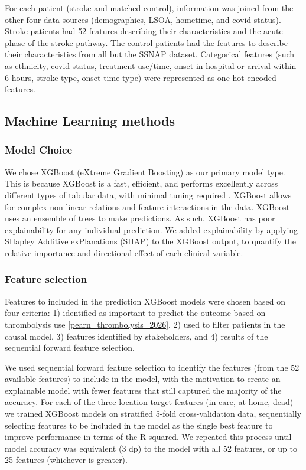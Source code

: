 For each patient (stroke and matched control), information was joined from the other four data sources (demographics, LSOA, hometime, and covid status). Stroke patients had 52 features describing their characteristics and the acute phase of the stroke pathway. The control patients had the features to describe their characteristics from all but the SSNAP dataset. Categorical features (such as ethnicity, covid status, treatment use/time, onset in hospital or arrival within 6 hours, stroke type, onset time type) were represented as one hot encoded features.

\subsection{Machine Learning methods}

\subsubsection{Model Choice}

We chose XGBoost (eXtreme Gradient Boosting) \cite{chen_xgboost_2016} as our primary model type. This is because XGBoost is  a fast, efficient, and performs excellently across different types of tabular data, with minimal tuning required \cite{shwartz-ziv_tabular_2022}. XGBoost allows for complex non-linear relations and feature-interactions in the data. XGBoost uses an ensemble of trees to make predictions. As such, XGBoost has poor explainability for any individual prediction. We added explainability by applying SHapley Additive exPlanations (SHAP) \cite{lundberg_consistent_2019} to the XGBoost output, to quantify the relative importance and directional effect of each clinical variable.

\subsubsection{Feature selection}

Features to included in the prediction XGBoost models were chosen based on four criteria: 1) identified as important to predict the outcome based on thrombolysis use \ref{pearn_thrombolysis_2026}, 2) used to filter patients in the causal model, 3) features identified by stakeholders, and 4) results of the sequential forward feature selection.

We used sequential forward feature selection to identify the features (from the 52 available features) to include in the model, with the motivation to create an explainable model with fewer features that still captured the majority of the accuracy. For each of the three location target features (in care, at home, dead) we trained XGBoost models on stratified 5-fold cross-validation data, sequentially selecting features to be included in the model as the single best feature to improve performance in terms of the R-squared. We repeated this process until model accuracy was equivalent (3 dp) to the model with all 52 features, or up to 25 features (whichever is greater).


